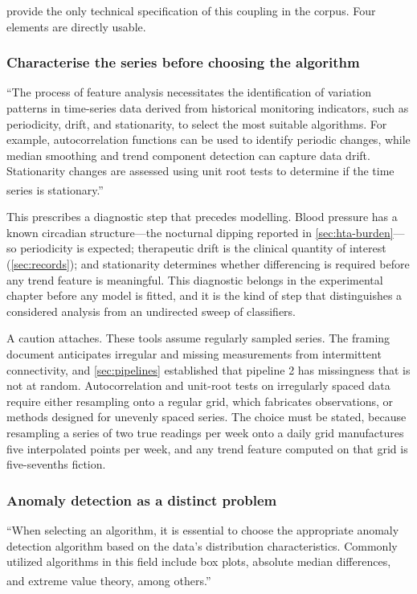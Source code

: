 \documentclass[12pt,a4paper,oneside]{report}
\newcommand{\bq}[1]{``#1''\textsuperscript{\dag}}
\begin{document}
\Textcite{liu2025review} provide the only technical specification of this coupling in the corpus. Four elements are directly usable.

\subsubsection{Characterise the series before choosing the algorithm}\label{sec:ts-diagnostics}

\bq{The process of feature analysis necessitates the identification of variation patterns in time-series data derived from historical monitoring indicators, such as periodicity, drift, and stationarity, to select the most suitable algorithms. For example, autocorrelation functions can be used to identify periodic changes, while median smoothing and trend component detection can capture data drift. Stationarity changes are assessed using unit root tests to determine if the time series is stationary.}

This prescribes a diagnostic step that precedes modelling. Blood pressure has a known circadian structure---the nocturnal dipping reported in \cref{sec:hta-burden}---so periodicity is expected; therapeutic drift is the clinical quantity of interest (\cref{sec:records}); and stationarity determines whether differencing is required before any trend feature is meaningful. This diagnostic belongs in the experimental chapter before any model is fitted, and it is the kind of step that distinguishes a considered analysis from an undirected sweep of classifiers.

A caution attaches. These tools assume regularly sampled series. The framing document anticipates irregular and missing measurements from intermittent connectivity, and \cref{sec:pipelines} established that pipeline 2 has missingness that is not at random. Autocorrelation and unit-root tests on irregularly spaced data require either resampling onto a regular grid, which fabricates observations, or methods designed for unevenly spaced series. The choice must be stated, because resampling a series of two true readings per week onto a daily grid manufactures five interpolated points per week, and any trend feature computed on that grid is five-sevenths fiction.

\subsubsection{Anomaly detection as a distinct problem}

\bq{When selecting an algorithm, it is essential to choose the appropriate anomaly detection algorithm based on the data's distribution characteristics. Commonly utilized algorithms in this field include box plots, absolute median differences, and extreme value theory, among others.}
\end{document}
